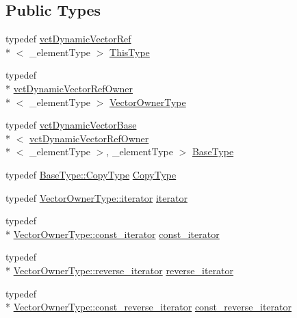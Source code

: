 \subsection*{Public Types}
\begin{DoxyCompactItemize}
\item 
typedef \hyperlink{classvct_dynamic_vector_ref}{vct\-Dynamic\-Vector\-Ref}\\*
$<$ \-\_\-element\-Type $>$ \hyperlink{classvct_dynamic_vector_ref_adde8a247e72c476120c26cfa15a37c6d}{This\-Type}
\item 
typedef \\*
\hyperlink{classvct_dynamic_vector_ref_owner}{vct\-Dynamic\-Vector\-Ref\-Owner}\\*
$<$ \-\_\-element\-Type $>$ \hyperlink{classvct_dynamic_vector_ref_a36c9bed92a3ffb5d3adc86deabbb671e}{Vector\-Owner\-Type}
\item 
typedef \hyperlink{classvct_dynamic_vector_base}{vct\-Dynamic\-Vector\-Base}\\*
$<$ \hyperlink{classvct_dynamic_vector_ref_owner}{vct\-Dynamic\-Vector\-Ref\-Owner}\\*
$<$ \-\_\-element\-Type $>$, \-\_\-element\-Type $>$ \hyperlink{classvct_dynamic_vector_ref_acebe42b08620767155f3b769ce292163}{Base\-Type}
\item 
typedef \hyperlink{classvct_dynamic_vector_base_a62fcc6341849207c5273566d0bce3cf5}{Base\-Type\-::\-Copy\-Type} \hyperlink{classvct_dynamic_vector_ref_a3d9425849772cea79d6ba9136ae2e3fd}{Copy\-Type}
\item 
typedef \hyperlink{classvct_dynamic_vector_ref_owner_aaee0b96d24843f333909f2aba3aad782}{Vector\-Owner\-Type\-::iterator} \hyperlink{classvct_dynamic_vector_ref_a60db16bd51d6129d93e63c1df05c544e}{iterator}
\item 
typedef \\*
\hyperlink{classvct_dynamic_vector_ref_owner_a4f7a05e13925c0eeb1d5c754c3193ba0}{Vector\-Owner\-Type\-::const\-\_\-iterator} \hyperlink{classvct_dynamic_vector_ref_a1ee3349f080cad407612465754d45c38}{const\-\_\-iterator}
\item 
typedef \\*
\hyperlink{classvct_dynamic_vector_ref_owner_a3949acd3baa131459d464b058d249990}{Vector\-Owner\-Type\-::reverse\-\_\-iterator} \hyperlink{classvct_dynamic_vector_ref_a4fe85ab37aaaa4b4bd16d4258e91d8b8}{reverse\-\_\-iterator}
\item 
typedef \\*
\hyperlink{classvct_dynamic_vector_ref_owner_a9ab3900ecbd8f4d4eb4615a2c9a972a3}{Vector\-Owner\-Type\-::const\-\_\-reverse\-\_\-iterator} \hyperlink{classvct_dynamic_vector_ref_a9600a1990f185ffa4e5a58793a56e8af}{const\-\_\-reverse\-\_\-iterator}
\end{DoxyCompactItemize}
